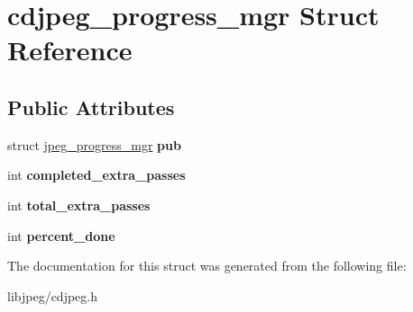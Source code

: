 \hypertarget{structcdjpeg__progress__mgr}{\section{cdjpeg\-\_\-progress\-\_\-mgr Struct Reference}
\label{structcdjpeg__progress__mgr}
}
\subsection*{Public Attributes}
\begin{DoxyCompactItemize}
\item 
\hypertarget{structcdjpeg__progress__mgr_a6303d12ac00b08da19794945793f983f}{struct \hyperlink{structjpeg__progress__mgr}{jpeg\-\_\-progress\-\_\-mgr} {\bfseries pub}}\label{structcdjpeg__progress__mgr_a6303d12ac00b08da19794945793f983f}

\item 
\hypertarget{structcdjpeg__progress__mgr_a6f5f9744a8fc43219bbb42d1757820e6}{int {\bfseries completed\-\_\-extra\-\_\-passes}}\label{structcdjpeg__progress__mgr_a6f5f9744a8fc43219bbb42d1757820e6}

\item 
\hypertarget{structcdjpeg__progress__mgr_a05c1a823d40d937b105e3ba2c13bc00d}{int {\bfseries total\-\_\-extra\-\_\-passes}}\label{structcdjpeg__progress__mgr_a05c1a823d40d937b105e3ba2c13bc00d}

\item 
\hypertarget{structcdjpeg__progress__mgr_a73fad2ed10876758edc5523d1cb10f8f}{int {\bfseries percent\-\_\-done}}\label{structcdjpeg__progress__mgr_a73fad2ed10876758edc5523d1cb10f8f}

\end{DoxyCompactItemize}


The documentation for this struct was generated from the following file\-:\begin{DoxyCompactItemize}
\item 
libjpeg/cdjpeg.\-h\end{DoxyCompactItemize}
